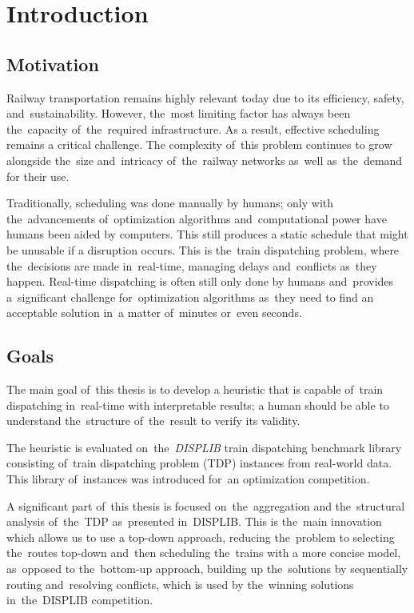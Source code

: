\chapter{Introduction}
\label{chap:intro}

\section{Motivation}

Railway transportation remains highly relevant today due to its efficiency, safety, and~sustainability. However, the~most limiting factor has always been the~capacity of~the~required infrastructure. As a result, effective scheduling remains a critical challenge. The complexity of~this problem continues to grow alongside the~size and~intricacy of~the~railway networks as~well as~the~demand for their use. 

Traditionally, scheduling was done manually by humans; only with the~advancements of~optimization algorithms and~computational power have humans been aided by computers. This still produces a static schedule that might be unusable if a disruption occurs. This is the~train dispatching problem, where the~decisions are made in~real-time, managing delays and~conflicts as~they happen. Real-time dispatching is often still only done by humans and~provides a~significant challenge for~optimization algorithms as~they need to find an acceptable solution in~a matter of~minutes or~even seconds.

\section{Goals}
The main goal of~this thesis is to develop a heuristic that is capable of~train dispatching in~real-time with interpretable results; a human should be able to understand the~structure of~the~result to verify its validity.

The heuristic is evaluated on~the~\emph{DISPLIB} train dispatching benchmark library \cite{kloster2025displiblibrarytraindispatching} consisting of~train dispatching problem (TDP) instances from real-world data. This library of~instances was introduced for~an optimization competition.

A significant part of~this thesis is focused on~the~aggregation and the~structural analysis of~the~TDP as~presented in~DISPLIB. This is the~main innovation which allows us to use a top-down approach, reducing the~problem to selecting the~routes top-down and~then scheduling the~trains with a more concise model, as~opposed to the~bottom-up approach, building up the~solutions by sequentially routing and~resolving conflicts, which is used by the~winning solutions in~the~DISPLIB competition.

